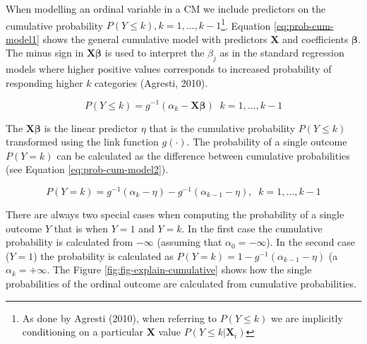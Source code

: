 \documentclass[
  man,floatsintext]{apa6}
\begin{document}
When modelling an ordinal variable in a CM we include predictors on the cumulative probability \(P(Y \leq k), k = 1, \dots, k - 1\)\footnote{As done by Agresti (2010), when referring to \(P(Y \leq k)\) we are implicitly conditioning on a particular \(\mathbf{X}\) value \(P(Y \leq k | \mathbf{X}_i)\)}. Equation \eqref{eq:prob-cum-model1} shows the general cumulative model with predictors \(\mathbf{X}\) and coefficients \(\boldsymbol{\beta}\). The minus sign in \(\mathbf{X} \boldsymbol{\beta}\) is used to interpret the \(\beta_j\) as in the standard regression models where higher positive values corresponds to increased probability of responding higher \(k\) categories (Agresti, 2010).

\begin{equation}
P(Y \leq k) = g^{-1}(\alpha_k - \mathbf{X} \boldsymbol{\beta}) \;\;k = 1, \dots, k - 1
\label{eq:prob-cum-model1}
\end{equation}

The \(\mathbf{X} \boldsymbol{\beta}\) is the linear predictor \(\eta\) that is the cumulative probability \(P(Y \leq k)\) transformed using the link function \(g(\cdot)\). The probability of a single outcome \(P(Y = k)\) can be calculated as the difference between cumulative probabilities (see Equation \eqref{eq:prob-cum-model2}).

\begin{equation}
P(Y = k) = g^{-1}(\alpha_k - \eta) -  g^{-1}(\alpha_{k - 1} - \eta), \;\;k = 1, \dots, k - 1
\label{eq:prob-cum-model2}
\end{equation}

There are always two special cases when computing the probability of a single outcome \(Y\) that is when \(Y = 1\) and \(Y = k\). In the first case the cumulative probability is calculated from \(-\infty\) (assuming that \(\alpha_0 = -\infty\)). In the second case (\(Y = 1\)) the probability is calculated as \(P(Y = k) = 1 - g^{-1}(\alpha_{k - 1} - \eta)\) (a \(\alpha_k = +\infty\). The Figure \ref{fig:fig-explain-cumulative} shows how the single probabilities of the ordinal outcome are calculated from cumulative probabilities.

\scriptsize
\end{document}

